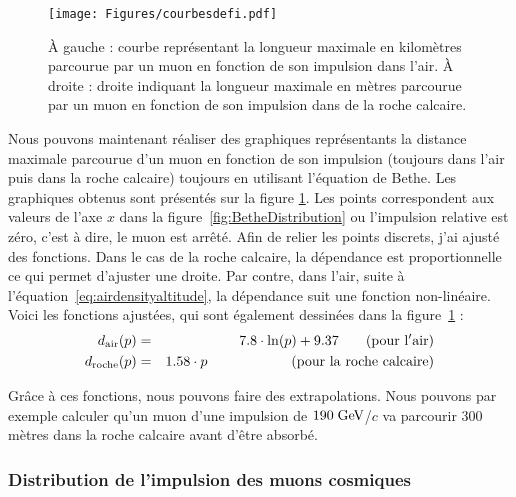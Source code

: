 \documentclass[a4paper, 12pt]{article}
\begin{document}
\begin{spacing}{1.5}
\begin{figure}[t]
\begin{center}
\texttt{[image: Figures/courbesdefi.pdf]}
\caption{\label{fig:BethePoints} À gauche : courbe représentant la longueur maximale en kilomètres parcourue par un muon en fonction de son impulsion dans l'air. À droite : droite indiquant la longueur maximale en mètres parcourue par un muon en fonction de son impulsion dans de la roche calcaire.}
\end{center}
\end{figure}

Nous pouvons maintenant réaliser des graphiques représentants la distance maximale parcourue d'un muon en fonction de son impulsion (toujours dans l'air puis dans la roche calcaire) toujours en utilisant l'équation de Bethe. Les graphiques obtenus sont présentés sur la figure \ref{fig:BethePoints}. Les points correspondent aux valeurs de l'axe $x$ dans la figure~\ref{fig:BetheDistribution} ou l'impulsion relative est zéro, c'est à dire, le muon est arrêté. Afin de relier les points discrets, j'ai ajusté des fonctions. Dans le cas de la roche calcaire, la dépendance est proportionnelle ce qui permet d'ajuster une droite. Par contre, dans l'air, suite à l'équation~\ref{eq:airdensityaltitude}, la dépendance suit une fonction non-linéaire. Voici les fonctions ajustées, qui sont également dessinées dans la figure~\ref{fig:BethePoints} :
\begin{eqnarray}
    d_{\rm air}(p) &=& 7.8\cdot\ln(p) + 9.37~~~\;~~   {\rm (pour~l'air)} \\
    d_{\rm roche}(p) &=& 1.58\cdot p ~~~~~~~~~~~~~~~~~~  {\rm (pour~la~roche~calcaire)}
\label{eq:rochedroiteprojection}
\end{eqnarray}

Grâce à ces fonctions, nous pouvons faire des extrapolations. Nous pouvons par exemple calculer qu'un muon d'une impulsion de $190\;{\rm GeV}$/$c$ va parcourir 300 mètres dans la roche calcaire avant d'être absorbé.

\subsubsection{Distribution de l'impulsion des muons cosmiques}


\end{spacing}
\end{document}
